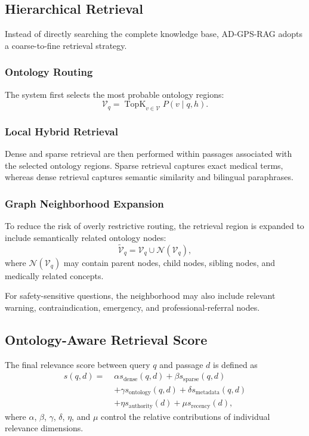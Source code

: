 \documentclass{article}
\begin{document}
\subsection{Hierarchical Retrieval}
Instead of directly searching the complete knowledge base, AD-GPS-RAG adopts a coarse-to-fine retrieval strategy.

\subsubsection{Ontology Routing}
The system first selects the most probable ontology regions:
\begin{equation}
    \mathcal{V}_q =
    \operatorname{TopK}_{v \in \mathcal{V}}
    P(v \mid q,h).
\end{equation}

\subsubsection{Local Hybrid Retrieval}
Dense and sparse retrieval are then performed within passages associated with the selected ontology regions. Sparse retrieval captures exact medical terms, whereas dense retrieval captures semantic similarity and bilingual paraphrases.

\subsubsection{Graph Neighborhood Expansion}

To reduce the risk of overly restrictive routing, the retrieval region is 
expanded to include semantically related ontology nodes:
\begin{equation}
    \widetilde{\mathcal{V}}_q
    =
    \mathcal{V}_q
    \cup
    \mathcal{N}(\mathcal{V}_q),
\end{equation}
where $\mathcal{N}(\mathcal{V}_q)$ may contain parent nodes, child nodes, sibling nodes, and medically related concepts.

For safety-sensitive questions, the neighborhood may also include relevant warning, contraindication, emergency, and professional-referral nodes.

\subsection{Ontology-Aware Retrieval Score}
The final relevance score between query $q$ and passage $d$ is defined as
\begin{equation}
\begin{split}
    s(q,d) =\;&
    \alpha s_{\mathrm{dense}}(q,d)
    +
    \beta s_{\mathrm{sparse}}(q,d)\\
    &+
    \gamma s_{\mathrm{ontology}}(q,d)
    +
    \delta s_{\mathrm{metadata}}(q,d)\\
    &+
    \eta s_{\mathrm{authority}}(d)
    +
    \mu s_{\mathrm{recency}}(d),
\end{split}
\end{equation}
where $\alpha$, $\beta$, $\gamma$, $\delta$, $\eta$, and $\mu$ control the relative contributions of individual relevance dimensions.
\end{document}
